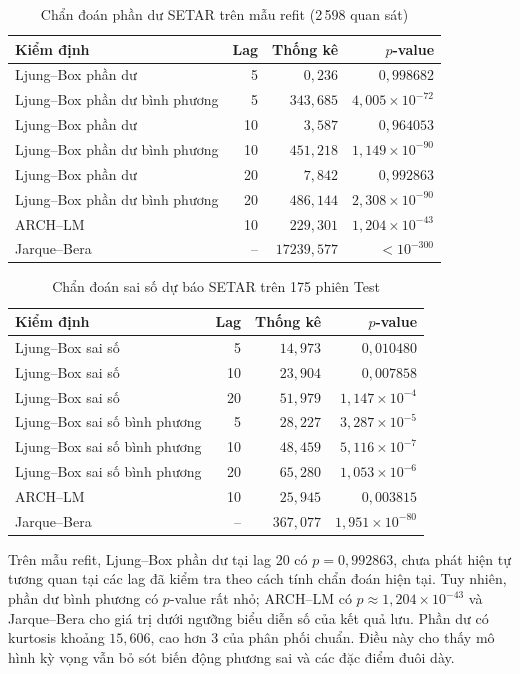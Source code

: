 \documentclass[a4paper,reqno,oneside]{book}
\numberwithin{equation}{chapter}
\begin{document}
\begin{table}[htbp]
\centering\small
\caption{Chẩn đoán phần dư SETAR trên mẫu refit (2\,598 quan sát)}
\label{tab:setar-diag-fit}
\begin{tabular}{lrrr}
\toprule
Kiểm định & Lag & Thống kê & $p$-value \\
\midrule
Ljung--Box phần dư & 5 & $0{,}236$ & $0{,}998682$ \\
Ljung--Box phần dư bình phương & 5 & $343{,}685$ & $4{,}005\times 10^{-72}$ \\
Ljung--Box phần dư & 10 & $3{,}587$ & $0{,}964053$ \\
Ljung--Box phần dư bình phương & 10 & $451{,}218$ & $1{,}149\times 10^{-90}$ \\
Ljung--Box phần dư & 20 & $7{,}842$ & $0{,}992863$ \\
Ljung--Box phần dư bình phương & 20 & $486{,}144$ & $2{,}308\times 10^{-90}$ \\
ARCH--LM & 10 & $229{,}301$ & $1{,}204\times 10^{-43}$ \\
Jarque--Bera & -- & $17239{,}577$ & $<10^{-300}$ \\
\bottomrule
\end{tabular}
\end{table}
\begin{table}[htbp]
\centering\small
\caption{Chẩn đoán sai số dự báo SETAR trên 175 phiên Test}
\label{tab:setar-diag-test}
\begin{tabular}{lrrr}
\toprule
Kiểm định & Lag & Thống kê & $p$-value \\
\midrule
Ljung--Box sai số & 5 & $14{,}973$ & $0{,}010480$ \\
Ljung--Box sai số & 10 & $23{,}904$ & $0{,}007858$ \\
Ljung--Box sai số & 20 & $51{,}979$ & $1{,}147\times 10^{-4}$ \\
Ljung--Box sai số bình phương & 5 & $28{,}227$ & $3{,}287\times 10^{-5}$ \\
Ljung--Box sai số bình phương & 10 & $48{,}459$ & $5{,}116\times 10^{-7}$ \\
Ljung--Box sai số bình phương & 20 & $65{,}280$ & $1{,}053\times 10^{-6}$ \\
ARCH--LM & 10 & $25{,}945$ & $0{,}003815$ \\
Jarque--Bera & -- & $367{,}077$ & $1{,}951\times 10^{-80}$ \\
\bottomrule
\end{tabular}
\end{table}

Trên mẫu refit, Ljung--Box phần dư tại lag 20 có $p=0{,}992863$, chưa phát hiện tự tương quan tại các lag đã kiểm tra theo cách tính chẩn đoán hiện tại. Tuy nhiên, phần dư bình phương có $p$-value rất nhỏ; ARCH--LM có $p\approx1{,}204\times10^{-43}$ và Jarque--Bera cho giá trị dưới ngưỡng biểu diễn số của kết quả lưu. Phần dư có kurtosis khoảng $15{,}606$, cao hơn 3 của phân phối chuẩn. Điều này cho thấy mô hình kỳ vọng vẫn bỏ sót biến động phương sai và các đặc điểm đuôi dày.
\end{document}
